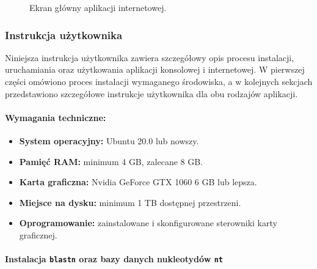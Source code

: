                 \begin{figure}
                    \begin{center}
                        
                    \end{center}
                    \caption{
                        Ekran główny aplikacji internetowej.
                    }\label{Picture:App:WebScreen}
                \end{figure}

        \subsubsection{Instrukcja użytkownika}

            Niniejsza instrukcja użytkownika zawiera szczegółowy opis procesu instalacji, uruchamiania oraz użytkowania aplikacji konsolowej i internetowej. W pierwszej części omówiono proces instalacji wymaganego środowiska, a w kolejnych sekcjach przedstawiono szczegółowe instrukcje użytkownika dla obu rodzajów aplikacji.

            \paragraph{Wymagania techniczne:}
                \begin{itemize}
                    \item {
                        \textbf{System operacyjny:} Ubuntu 20.0 lub nowszy.
                    }
                    \item {
                        \textbf{Pamięć RAM:} minimum 4 GB, zalecane 8 GB.
                    }
                    \item {
                        \textbf{Karta graficzna:} Nvidia GeForce GTX 1060 6 GB lub lepsza.
                    }
                    \item {
                        \textbf{Miejsce na dysku:} minimum 1 TB dostępnej przestrzeni.
                    }
                    \item {
                        \textbf{Oprogramowanie:} zainstalowane i skonfigurowane sterowniki karty graficznej.
                    }
                \end{itemize}

            \paragraph{Instalacja \texttt{blastn} oraz bazy danych nukleotydów \texttt{nt}}

